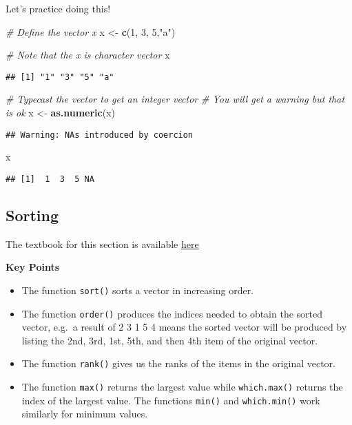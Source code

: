 \documentclass[]{article}
\newenvironment{Shaded}{\begin{snugshade}}{\end{snugshade}}
\newcommand{\CommentTok}[1]{\textcolor[rgb]{0.56,0.35,0.01}{\textit{#1}}}
\newcommand{\DecValTok}[1]{\textcolor[rgb]{0.00,0.00,0.81}{#1}}
\newcommand{\KeywordTok}[1]{\textcolor[rgb]{0.13,0.29,0.53}{\textbf{#1}}}
\newcommand{\NormalTok}[1]{#1}
\newcommand{\StringTok}[1]{\textcolor[rgb]{0.31,0.60,0.02}{#1}}
\providecommand{\tightlist}{%
  \setlength{\itemsep}{0pt}\setlength{\parskip}{0pt}}
\begin{document}
Let's practice doing this!

\begin{Shaded}
\begin{Highlighting}[]
\CommentTok{# Define the vector x}
\NormalTok{x <-}\StringTok{ }\KeywordTok{c}\NormalTok{(}\DecValTok{1}\NormalTok{, }\DecValTok{3}\NormalTok{, }\DecValTok{5}\NormalTok{,}\StringTok{"a"}\NormalTok{)}

\CommentTok{# Note that the x is character vector}
\NormalTok{x}
\end{Highlighting}
\end{Shaded}

\begin{verbatim}
## [1] "1" "3" "5" "a"
\end{verbatim}

\begin{Shaded}
\begin{Highlighting}[]
\CommentTok{# Typecast the vector to get an integer vector}
\CommentTok{# You will get a warning but that is ok}
\NormalTok{x <-}\StringTok{ }\KeywordTok{as.numeric}\NormalTok{(x)}
\end{Highlighting}
\end{Shaded}

\begin{verbatim}
## Warning: NAs introduced by coercion
\end{verbatim}

\begin{Shaded}
\begin{Highlighting}[]
\NormalTok{x}
\end{Highlighting}
\end{Shaded}

\begin{verbatim}
## [1]  1  3  5 NA
\end{verbatim}

\hypertarget{sorting}{%
\subsection{Sorting}\label{sorting}}

The textbook for this section is available
\href{https://rafalab.github.io/dsbook/r-basics.html\#sorting}{here}

\textbf{Key Points}

\begin{itemize}
\tightlist
\item
  The function \texttt{sort()} sorts a vector in increasing order.
\item
  The function \texttt{order()} produces the indices needed to obtain
  the sorted vector, e.g.~a result of 2 3 1 5 4 means the sorted vector
  will be produced by listing the 2nd, 3rd, 1st, 5th, and then 4th item
  of the original vector.
\item
  The function \texttt{rank()} gives us the ranks of the items in the
  original vector.
\item
  The function \texttt{max()} returns the largest value while
  \texttt{which.max()} returns the index of the largest value. The
  functions \texttt{min()} and \texttt{which.min()} work similarly for
  minimum values.
\end{itemize}
\end{document}
